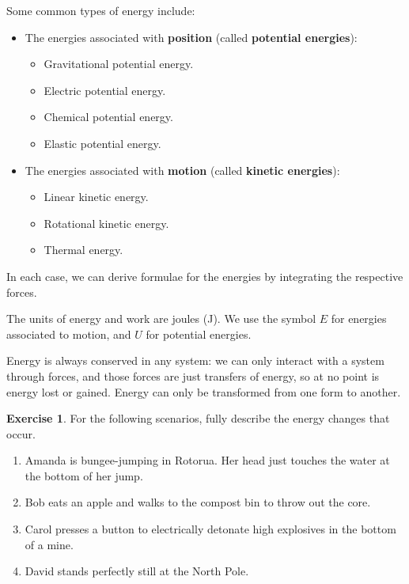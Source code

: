 \documentclass[a4paper]{amsbook}
\theoremstyle{definition}
\newtheorem{exercise}{Exercise}
\numberwithin{exercise}{chapter}
\numberwithin{exercise}{chapter}
\begin{document}
Some common types of energy include:
\begin{itemize}
  \item The energies associated with \textbf{position} (called \textbf{potential energies}):
    \begin{itemize}
      \item Gravitational potential energy.
      \item Electric potential energy.
      \item Chemical potential energy.
      \item Elastic potential energy.
    \end{itemize}
  \item The energies associated with \textbf{motion} (called \textbf{kinetic energies}):
    \begin{itemize}
      \item Linear kinetic energy.
      \item Rotational kinetic energy.
      \item Thermal energy.
    \end{itemize}
\end{itemize}
In each case, we can derive formulae for the energies by integrating the respective forces.

The units of energy and work are joules (J). We use the symbol $ E $ for energies associated to motion, and $ U $ for potential energies.

Energy is always conserved in any system: we can only interact with a system through forces, and those forces are just transfers of
energy, so at no point is energy lost or gained. Energy can only be transformed from one form to another.

\begin{exercise}
  For the following scenarios, fully describe the energy changes that occur.
  \begin{enumerate}
    \item Amanda is bungee-jumping in Rotorua. Her head just touches the water at the bottom of her jump.
    \item Bob eats an apple and walks to the compost bin to throw out the core.
    \item Carol presses a button to electrically detonate high explosives in the bottom of a mine.
    \item David stands perfectly still at the North Pole.
  \end{enumerate}
\end{exercise}
\end{document}
